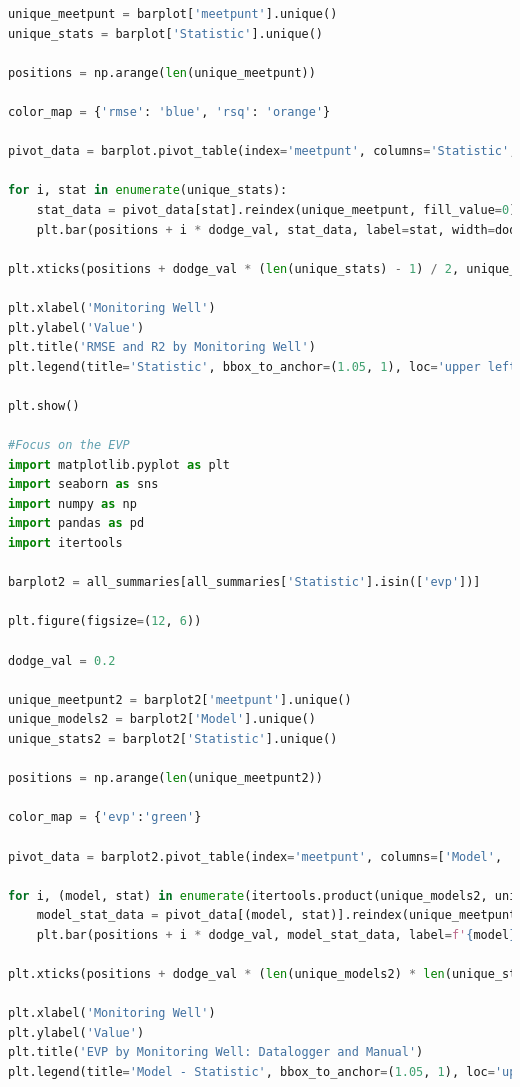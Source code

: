 \begin{lstlisting}[language=Python]
unique_meetpunt = barplot['meetpunt'].unique()
unique_stats = barplot['Statistic'].unique()

positions = np.arange(len(unique_meetpunt))

color_map = {'rmse': 'blue', 'rsq': 'orange'}

pivot_data = barplot.pivot_table(index='meetpunt', columns='Statistic', values='Value', aggfunc=np.mean, fill_value=0)

for i, stat in enumerate(unique_stats):
    stat_data = pivot_data[stat].reindex(unique_meetpunt, fill_value=0)
    plt.bar(positions + i * dodge_val, stat_data, label=stat, width=dodge_val)

plt.xticks(positions + dodge_val * (len(unique_stats) - 1) / 2, unique_meetpunt, rotation=45)

plt.xlabel('Monitoring Well')
plt.ylabel('Value')
plt.title('RMSE and R2 by Monitoring Well')
plt.legend(title='Statistic', bbox_to_anchor=(1.05, 1), loc='upper left')

plt.show()

#Focus on the EVP 
import matplotlib.pyplot as plt
import seaborn as sns
import numpy as np
import pandas as pd
import itertools  

barplot2 = all_summaries[all_summaries['Statistic'].isin(['evp'])]

plt.figure(figsize=(12, 6))

dodge_val = 0.2

unique_meetpunt2 = barplot2['meetpunt'].unique()
unique_models2 = barplot2['Model'].unique()
unique_stats2 = barplot2['Statistic'].unique()

positions = np.arange(len(unique_meetpunt2))

color_map = {'evp':'green'}

pivot_data = barplot2.pivot_table(index='meetpunt', columns=['Model', 'Statistic'], values='Value', fill_value=0)

for i, (model, stat) in enumerate(itertools.product(unique_models2, unique_stats2)):
    model_stat_data = pivot_data[(model, stat)].reindex(unique_meetpunt2, fill_value=0)
    plt.bar(positions + i * dodge_val, model_stat_data, label=f'{model} - {stat}', width=dodge_val)

plt.xticks(positions + dodge_val * (len(unique_models2) * len(unique_stats2) - 1) / 2, unique_meetpunt2, rotation=45)

plt.xlabel('Monitoring Well')
plt.ylabel('Value')
plt.title('EVP by Monitoring Well: Datalogger and Manual')
plt.legend(title='Model - Statistic', bbox_to_anchor=(1.05, 1), loc='upper left')


\end{lstlisting}
